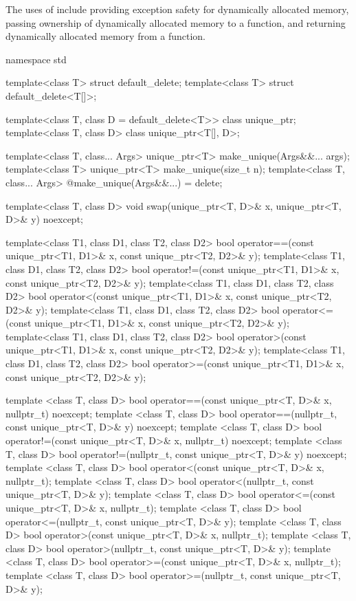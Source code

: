 \pnum
\begin{note} The uses
of  include providing exception safety for
dynamically allocated memory, passing ownership of dynamically allocated
memory to a function, and returning dynamically allocated memory from a
function. \end{note}

\begin{codeblock}
namespace std {
  template<class T> struct default_delete;
  template<class T> struct default_delete<T[]>;

  template<class T, class D = default_delete<T>> class unique_ptr;
  template<class T, class D> class unique_ptr<T[], D>;

  template<class T, class... Args> unique_ptr<T> make_unique(Args&&... args);
  template<class T> unique_ptr<T> make_unique(size_t n);
  template<class T, class... Args> @\unspec@ make_unique(Args&&...) = delete;

  template<class T, class D> void swap(unique_ptr<T, D>& x, unique_ptr<T, D>& y) noexcept;

  template<class T1, class D1, class T2, class D2>
    bool operator==(const unique_ptr<T1, D1>& x, const unique_ptr<T2, D2>& y);
  template<class T1, class D1, class T2, class D2>
    bool operator!=(const unique_ptr<T1, D1>& x, const unique_ptr<T2, D2>& y);
  template<class T1, class D1, class T2, class D2>
    bool operator<(const unique_ptr<T1, D1>& x, const unique_ptr<T2, D2>& y);
  template<class T1, class D1, class T2, class D2>
    bool operator<=(const unique_ptr<T1, D1>& x, const unique_ptr<T2, D2>& y);
  template<class T1, class D1, class T2, class D2>
    bool operator>(const unique_ptr<T1, D1>& x, const unique_ptr<T2, D2>& y);
  template<class T1, class D1, class T2, class D2>
    bool operator>=(const unique_ptr<T1, D1>& x, const unique_ptr<T2, D2>& y);

  template <class T, class D>
    bool operator==(const unique_ptr<T, D>& x, nullptr_t) noexcept;
  template <class T, class D>
    bool operator==(nullptr_t, const unique_ptr<T, D>& y) noexcept;
  template <class T, class D>
    bool operator!=(const unique_ptr<T, D>& x, nullptr_t) noexcept;
  template <class T, class D>
    bool operator!=(nullptr_t, const unique_ptr<T, D>& y) noexcept;
  template <class T, class D>
    bool operator<(const unique_ptr<T, D>& x, nullptr_t);
  template <class T, class D>
    bool operator<(nullptr_t, const unique_ptr<T, D>& y);
  template <class T, class D>
    bool operator<=(const unique_ptr<T, D>& x, nullptr_t);
  template <class T, class D>
    bool operator<=(nullptr_t, const unique_ptr<T, D>& y);
  template <class T, class D>
    bool operator>(const unique_ptr<T, D>& x, nullptr_t);
  template <class T, class D>
    bool operator>(nullptr_t, const unique_ptr<T, D>& y);
  template <class T, class D>
    bool operator>=(const unique_ptr<T, D>& x, nullptr_t);
  template <class T, class D>
    bool operator>=(nullptr_t, const unique_ptr<T, D>& y);

}
\end{codeblock}


